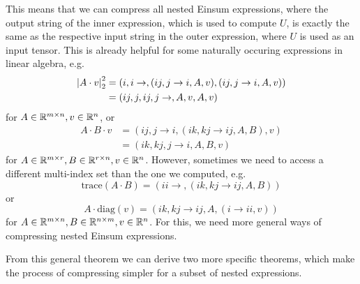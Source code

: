 

This means that we can compress all nested Einsum expressions, where the output string of the inner expression, which is used to compute $U$, is exactly the same as the respective input string in the outer expression, where $U$ is used as an input tensor.
This is already helpful for some naturally occuring expressions in linear algebra, e.g.
\begin{align*}
    \left\lvert A \cdot v \right\rvert_2^2 & = (i,i\rightarrow,(ij, j \rightarrow i, A, v),(ij, j \rightarrow i, A, v)) \\
                        & = (ij,j,ij,j\rightarrow,A,v,A,v)
\end{align*}
for $A \in \mathbb{R}^{m \times n}, v \in \mathbb{R}^{n}$, or
\begin{align*}
    A \cdot B \cdot v & = (ij, j \rightarrow i, (ik, kj \rightarrow ij, A, B), v) \\
                      & = (ik,kj,j \rightarrow i, A, B, v)
\end{align*}
for $A \in \mathbb{R}^{m \times r}, B \in \mathbb{R}^{r \times n}, v \in \mathbb{R}^n$.
However, sometimes we need to access a different multi-index set than the one we computed, e.g.
$$\text{trace}(A \cdot B) = (ii \rightarrow, (ik, kj \rightarrow ij, A, B))$$
or
$$A \cdot \text{diag}(v) = (ik, kj \rightarrow ij, A, (i \rightarrow ii, v))$$
for $A \in \mathbb{R}^{m \times n}, B \in \mathbb{R}^{n \times m}, v \in \mathbb{R}^{n}$.
For this, we need more general ways of compressing nested Einsum expressions.



From this general theorem we can derive two more specific theorems,
which make the process of compressing simpler for a subset of nested expressions.


